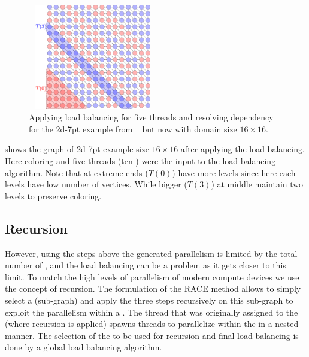   \setlength{\belowcaptionskip}{-10pt}
  \begin{figure}[t]
  	\begin{minipage}[c]{0.26\textwidth}
  	\includegraphics[height=12.4em,width=15.2em]{pics/race_method/load_balancing}
  	\end{minipage}\hspace{2.2em}
  	 \begin{minipage}[c]{0.16\textwidth}
  	\caption{\label{fig:lb} Applying load balancing for five threads and resolving \DTWO
  		dependency for the 2d-7pt example from ~ but now with domain size $16\times16$.  }
  	\end{minipage}
  \end{figure}
   \setlength{\belowcaptionskip}{0pt}
   
   shows the graph of 2d-7pt example size $16\times16$ after
   applying the load balancing. Here \DTWO coloring and five threads
    (\ie ten \levelGroups) were the input to the load balancing algorithm.
    Note that \levelGroups at extreme ends (\eg $T(0)$) have more levels
    since here each levels have low number of vertices. While bigger \levelGroups
    (\eg $T(3)$) at middle maintain two levels to preserve \DK coloring.
    
\subsection{Recursion}
However, using the steps above the generated parallelism is limited by the total number
of \levels, and the load balancing can be a problem as it gets closer to this limit.
To match the high levels of parallelism of modern compute devices  we use the
concept of recursion. The formulation of the \acrshort{RACE} method allows
 to simply select a \levelGroup (sub-graph) and apply the three
 steps recursively on this sub-graph to exploit the parallelism 
 within a \levelGroup. The thread that was originally assigned to the
 \levelGroup (where recursion is applied) spawns threads to parallelize
 within the \levelGroup in a nested manner. 
 The selection of the \levelGroup to be used for recursion and final load balancing 
 is done by  a global load balancing algorithm.
 
